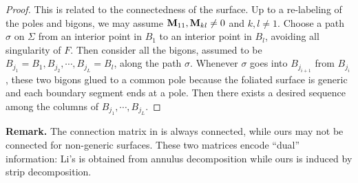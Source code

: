 \documentclass[pdflatex,sn-mathphys]{sn-jnl}%
\numberwithin{equation}{section}
\theoremstyle{thmstyleone}%
\begin{document}
\begin{proof}%
    This is related to the connectedness of the surface. Up to a re-labeling of the poles and bigons, we may assume $\mathbf{M}_{11}, \mathbf{M}_{kl}\neq 0$ and $k, l \neq 1$. %
    Choose a path $\sigma$ on $\Sigma$ from an interior point in $B_1$ to an interior point in $B_l$, avoiding all singularity of $F$. Then consider all the bigons, assumed to be $B_{j_1}=B_1, B_{j_2}, \cdots, B_{j_L}=B_l$, along the path $\sigma$. Whenever $\sigma$ goes into $B_{j_{i+1}}$ from $B_{j_i}$, these two bigons glued to a common pole because the foliated surface is generic and each boundary segment ends at a pole. Then there exists a desired sequence among the columns of $B_{j_1},\cdots, B_{j_L}$.
\end{proof}

\textbf{Remark.} The connection matrix in \cite{Li19} is always connected, while ours may not be connected for non-generic surfaces. These two matrices encode ``dual'' information: Li's is obtained from annulus decomposition while ours is induced by strip decomposition. %
\end{document}
